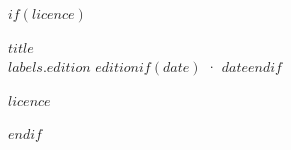 $if(licence)$
\thispagestyle{empty}
\vspace*{\fill}
{\small
\noindent $title$\\
$labels.edition$ $edition$$if(date)$ · $date$$endif$\par
\medskip
\noindent $licence$\par}
\clearpage
$endif$
